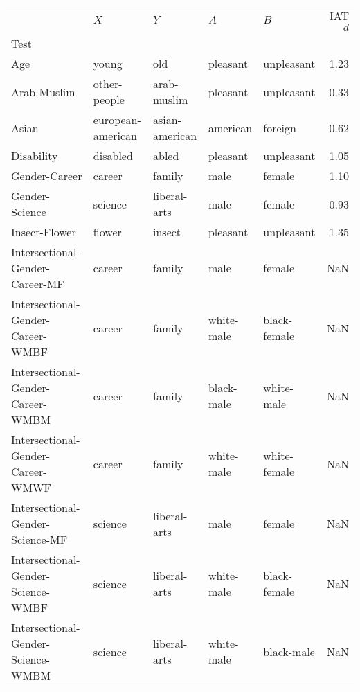 \begin{tabular}{lllllr}
\toprule
{} &                $X$ &               $Y$ &           $A$ &            $B$ &  IAT $d$ \\
Test                               &                    &                   &               &                &          \\
\midrule
Age                                &              young &               old &      pleasant &     unpleasant &     1.23 \\
Arab-Muslim                        &       other-people &       arab-muslim &      pleasant &     unpleasant &     0.33 \\
Asian                              &  european-american &    asian-american &      american &        foreign &     0.62 \\
Disability                         &           disabled &             abled &      pleasant &     unpleasant &     1.05 \\
Gender-Career                      &             career &            family &          male &         female &     1.10 \\
Gender-Science                     &            science &      liberal-arts &          male &         female &     0.93 \\
Insect-Flower                      &             flower &            insect &      pleasant &     unpleasant &     1.35 \\
Intersectional-Gender-Career-MF    &             career &            family &          male &         female &      NaN \\
Intersectional-Gender-Career-WMBF  &             career &            family &    white-male &   black-female &      NaN \\
Intersectional-Gender-Career-WMBM  &             career &            family &    black-male &     white-male &      NaN \\
Intersectional-Gender-Career-WMWF  &             career &            family &    white-male &   white-female &      NaN \\
Intersectional-Gender-Science-MF   &            science &      liberal-arts &          male &         female &      NaN \\
Intersectional-Gender-Science-WMBF &            science &      liberal-arts &    white-male &   black-female &      NaN \\
Intersectional-Gender-Science-WMBM &            science &      liberal-arts &    white-male &     black-male &      NaN \\

\end{tabular}
